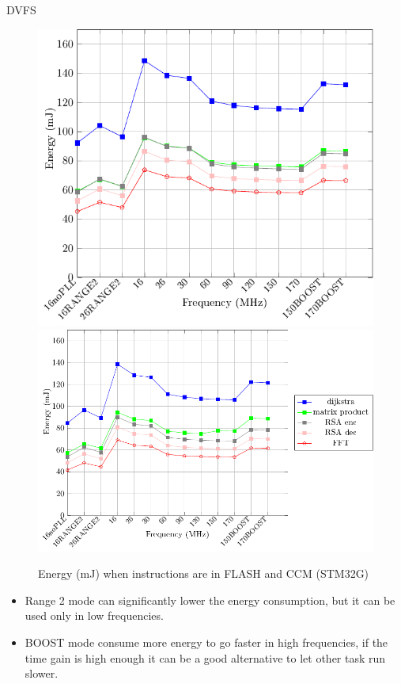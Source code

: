 \documentclass[
	11pt, %
]{beamer}
\begin{document}
\begin{frame}{DVFS}
	\begin{figure}
		\includegraphics[scale = 0.4]{data/stm32g_v2/abs/abs_energy_flash_32g.pdf}
		\includegraphics[scale = 0.4]{data/stm32g_v2/abs/abs_energy_ccm.pdf}
		\caption{Energy (mJ) when instructions are in FLASH and CCM (STM32G)}
	\end{figure}
	\begin{itemize}
		\item Range 2 mode can significantly lower the energy consumption, but it can be used only in low frequencies.
		\item BOOST mode consume more energy to go faster in high frequencies, if the time gain is high enough it can be a good alternative to let other task run slower. 
	\end{itemize}
\end{frame}
\end{document}

